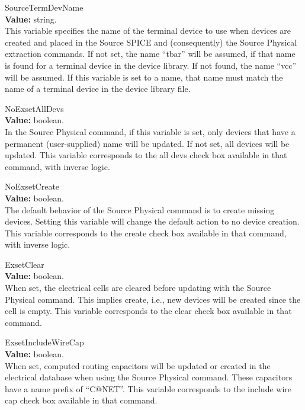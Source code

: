 \begin{description}
\item{\et SourceTermDevName}\\
{\bf Value:} string.\\
This variable specifies the name of the terminal device to use when
devices are created and placed in the {\cb Source SPICE} and
(consequently) the {\cb Source Physical} extraction commands.  If not
set, the name ``{\vt tbar}'' will be assumed, if that name is found
for a terminal device in the device library.  If not found, the name
``{\vt vcc}'' will be assumed.  If this variable is set to a name,
that name must match the name of a terminal device in the device
library file.

\item{\et NoExsetAllDevs}\\
{\bf Value:} boolean.\\
In the {\cb Source Physical} command, if this variable is set, only
devices that have a permanent (user-supplied) name will be updated. 
If not set, all devices will be updated.  This variable corresponds to
the {\et all devs} check box available in that command, with inverse
logic.

\item{\et NoExsetCreate}\\
{\bf Value:} boolean.\\
The default behavior of the {\cb Source Physical} command is to create
missing devices.  Setting this variable will change the default action
to no device creation.  This variable corresponds to the {\et create}
check box available in that command, with inverse logic.

\item{\et ExsetClear}\\
{\bf Value:} boolean.\\
When set, the electrical cells are cleared before updating with the
{\cb Source Physical} command.  This implies {\et create}, i.e., new
devices will be created since the cell is empty.  This variable
corresponds to the {\et clear} check box available in that command. 

\item{\et ExsetIncludeWireCap}\\
{\bf Value:} boolean.\\
When set, computed routing capacitors will be updated or created in
the electrical database when using the {\cb Source Physical} command. 
These capacitors have a name prefix of ``{\vt C@NET}''.  This variable
corresponds to the {\et include wire cap} check box available in that
command.


\end{description}
